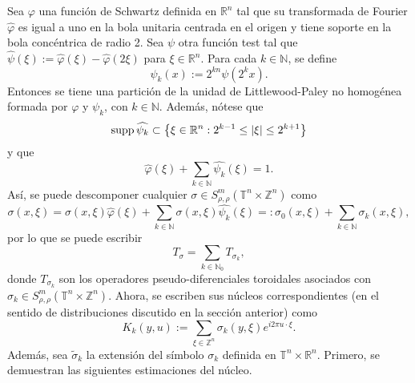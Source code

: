 Sea $\varphi$ una función de Schwartz definida en $\mathbb{R}^n$ tal que su transformada de Fourier $\widehat{\varphi}$ es igual a uno en la bola unitaria centrada en el origen y tiene soporte en la bola concéntrica de radio 2. Sea $\psi$ otra función test tal que $\widehat{\psi}(\xi) := \widehat{\varphi}(\xi) - \widehat{\varphi}(2\xi)$ para $\xi \in \mathbb{R}^n$. Para cada $k \in \mathbb{N}$, se define
\begin{equation*}
	\psi_k(x):=2^{kn}\psi(2^kx).
\end{equation*}
Entonces se tiene una partición de la unidad de Littlewood-Paley no homogénea formada por $\varphi$ y $\psi_k$, con $k\in\mathbb{N}$. Además, nótese que 
\begin{equation*}
	\operatorname{supp} \widehat{\psi_k} \subset \left\{\xi \in \mathbb{R}^n : 2^{k-1} \leq |\xi|\leq 2^{k+1}\right\}
\end{equation*}
y que
\begin{equation*}
	\widehat{\varphi}(\xi) + \sum_{k\in\mathbb{N}} \widehat{\psi_k}(\xi) = 1.
\end{equation*}
Así, se puede descomponer cualquier $\sigma \in S^m_{\rho,\rho}(\mathbb{T}^n \times \mathbb{Z}^n)$ como 
\begin{equation*}
	\sigma(x,\xi) = \sigma(x,\xi)\widehat{\varphi}(\xi) + \sum_{k\in \mathbb{N}} \sigma(x,\xi)\widehat{\psi_k}(\xi) =: \sigma_0(x,\xi) + \sum_{k\in \mathbb{N}} \sigma_k(x,\xi),
\end{equation*}
por lo que se puede escribir 
\begin{equation*}
	T_\sigma = \sum_{k\in \mathbb{N}_0} T_{\sigma_k},
\end{equation*}
donde $T_{\sigma_k}$ son los operadores pseudo-diferenciales toroidales asociados con $\sigma_k \in S^m_{\rho,\rho}(\mathbb{T}^n \times \mathbb{Z}^n)$. Ahora, se escriben sus núcleos correspondientes (en el sentido de distribuciones discutido en la sección anterior) como
\begin{equation}
	K_k(y, u) := \sum_{\xi \in \mathbb{Z}^n} \sigma_k(y, \xi)e^{i2\pi u \cdot \xi}.
	\label{eq:kernel-Kk}
\end{equation}
Además, sea $\tilde{\sigma}_k$ la extensión del símbolo $\sigma_k$ definida en $\mathbb{T}^n \times \mathbb{R}^n$. Primero, se demuestran las siguientes estimaciones del núcleo.
